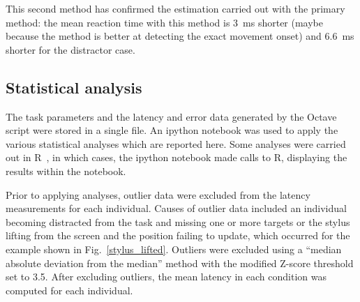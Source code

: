 \documentclass[10pt,letterpaper]{article}
\newcommand{\filename}[1]{\textsf{\textbf{#1}}}
\newcommand{\codeparam}[1]{\textsf{\textbf{#1}}}
\begin{document}
This second method has confirmed the estimation carried out with the
primary method: the mean reaction time with this method is 3~ms
shorter (maybe because the method is better at detecting the exact
movement onset) and 6.6~ms shorter for the distractor case.

\subsection*{Statistical analysis}

%
The task parameters and the latency and error data generated by the
Octave script were stored in a single file. An ipython notebook was
used to apply the various statistical analyses which are reported
here. Some analyses were carried out in R~\cite{r_core_team_r:_2013},
in which cases, the ipython notebook made calls to R, displaying the
results within the notebook.

Prior to applying analyses, outlier data were excluded from the
latency measurements for each individual.
%
%
Causes of outlier data included an individual becoming distracted from
the task and missing one or more targets or the stylus lifting from
the screen and the position failing to update, which occurred for the
example shown in Fig.~\ref{stylus_lifted}. Outliers were excluded
using a ``median absolute deviation from the median'' method
\cite{boris_iglewicz_how_1993} with the modified Z-score threshold set
to 3.5. After excluding outliers, the mean latency in each condition
was computed for each individual.
\end{document}
